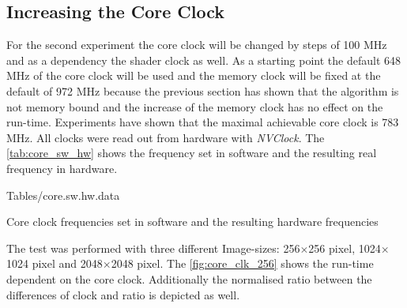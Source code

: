 
\subsection{Increasing the Core Clock} %
\label{sub:increasing_the_core_clock}
For the second experiment the core clock will be changed by steps of 100
\gls{MHz} and as a dependency the shader clock as well. As a starting point the
default 648 \gls{MHz} of the core clock will be used and the memory clock will
be fixed at the default of 972 \gls{MHz} because the previous section has shown
that the algorithm is not memory bound and the increase of the memory clock has
no effect on the run-time. Experiments have shown that the maximal achievable
core clock is 783 \gls{MHz}. All clocks were read out from hardware with
\emph{NVClock}. The \autoref{tab:core_sw_hw} shows the frequency set in software
and the resulting real frequency in hardware.

\begin{table}[ht]
    \centering
	
	\pgfplotstabletypeset%
												{Tables/core.sw.hw.data}

 	\caption{Core clock frequencies set in software and the resulting hardware frequencies}
 	\label{tab:core_sw_hw}
\end{table}



The test was performed with three different Image-sizes: 256$\times$256 pixel, 
1024$\times$1024 pixel and 2048$\times$2048 pixel. The \autoref{fig:core_clk_256}
shows the run-time dependent on the core clock. Additionally the normalised
ratio between the differences of clock and ratio is depicted as well. 

